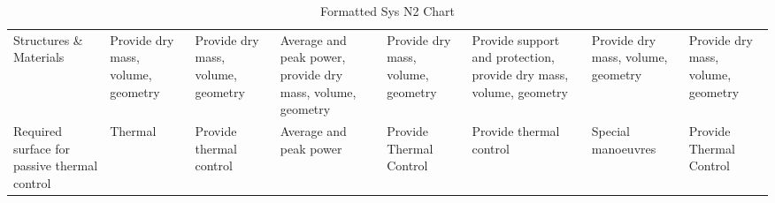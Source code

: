 



% 

\begin{small}
\begin{longtable}{C{\tabcolsep} C{\tabcolsep} C{\tabcolsep} C{\tabcolsep} C{\tabcolsep} C{\tabcolsep} C{\tabcolsep} C{\tabcolsep} }
\caption{Formatted Sys N2 Chart}\label{tab:FormattedS}\\ 
\toprule
                                                    Structures \& Materials &                                             Provide dry mass, volume, geometry &                               Provide dry mass, volume, geometry &   Average and peak power, provide dry mass, volume, geometry &   Provide dry mass, volume, geometry &   Provide support and protection, provide dry mass, volume, geometry &                                       Provide dry mass, volume, geometry &                       Provide dry mass, volume, geometry \\
\addlinespace[\tableskip]
                               Required surface for passive thermal control &                                                                        Thermal &                                          Provide thermal control &                                       Average and peak power &              Provide Thermal Control &                                              Provide thermal control &                                                       Special manoeuvres &                                  Provide Thermal Control \\

\end{longtable}
\end{small}
